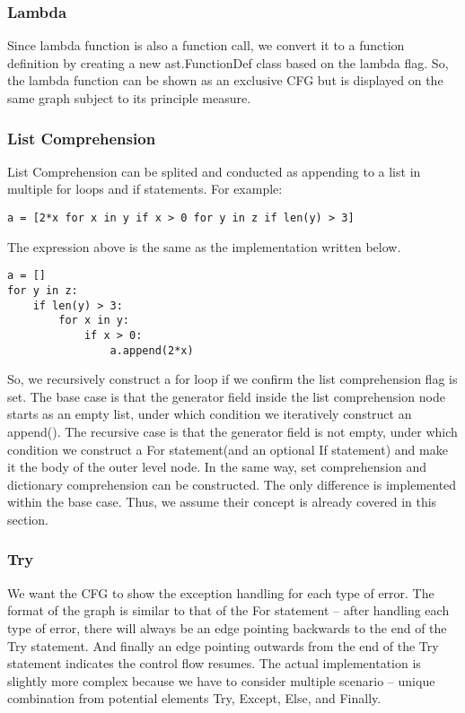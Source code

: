 \documentclass[11pt]{article}
\begin{document}
\subsubsection{Lambda}
Since lambda function is also a function call, we convert it to a function definition by creating a new ast.FunctionDef class based on the lambda flag. So, the lambda function can be shown as an exclusive CFG but is displayed on the same graph subject to its principle measure.

\subsubsection{List Comprehension}
List Comprehension can be splited and conducted as appending to a list in multiple for loops and if statements. For example:
\begin{lstlisting}
a = [2*x for x in y if x > 0 for y in z if len(y) > 3]
\end{lstlisting}
The expression above is the same as the implementation written below.
\begin{lstlisting}
a = []
for y in z:
    if len(y) > 3:
        for x in y:
            if x > 0:
                a.append(2*x)
\end{lstlisting}
So, we recursively construct a for loop if we confirm the list comprehension flag is set. The base case is that the generator field inside the list comprehension node starts as an empty list, under which condition we iteratively construct an append(). The recursive case is that the generator field is not empty, under which condition we construct a For statement(and an optional If statement) and make it the body of the outer level node. In the same way, set comprehension and dictionary comprehension can be constructed. The only difference is implemented within the base case. Thus, we assume their concept is already covered in this section.

\subsubsection{Try}
We want the CFG to show the exception handling for each type of error. The format of the graph is similar to that of the For statement -- after handling each type of error, there will always be an edge pointing backwards to the end of the Try statement. And finally an edge pointing outwards from the end of the Try statement indicates the control flow resumes. The actual implementation is slightly more complex because we have to consider multiple scenario -- unique combination from potential elements Try, Except, Else, and Finally.
\end{document}
